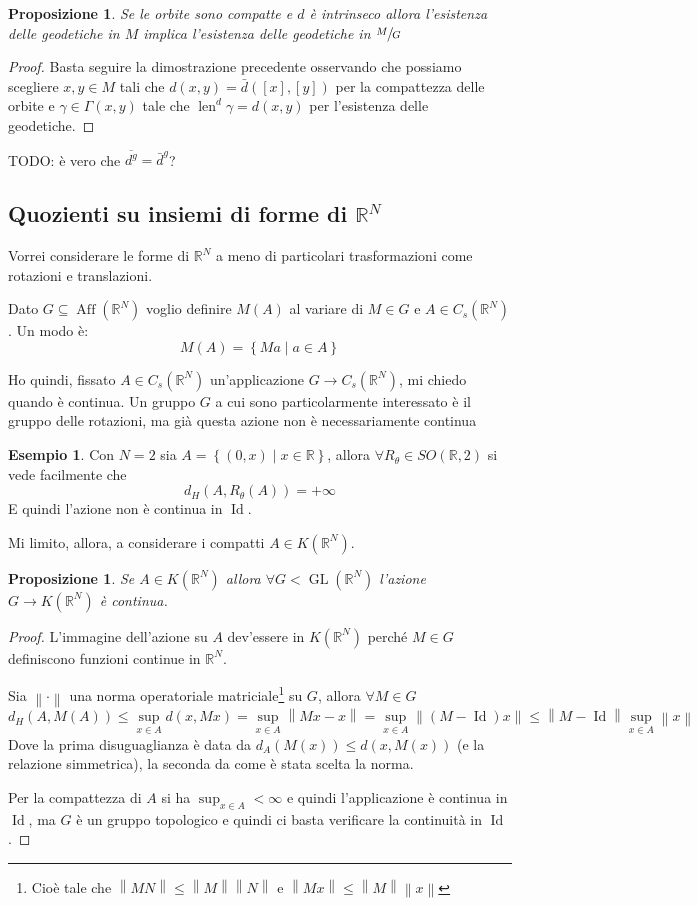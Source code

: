 \documentclass[a4paper,10pt]{article}
\newcounter{counter1}
\theoremstyle{plain}
\newtheorem{mypro}[counter1]{Proposizione}
\theoremstyle{definition}
\newtheorem{myes}[counter1]{Esempio}
\theoremstyle{remark}
\newcommand{\obar}[1]{\overline{#1}}
\newcommand{\set}[1]{\left\{#1\right\}}
\newcommand{\pa}[1]{\left(#1\right)}
\newcommand{\bra}[1]{\left[#1\right]}
\newcommand{\norm}[1]{\left\|#1\right\|}
\DeclareMathOperator{\id}{Id}
\DeclareMathOperator{\len}{len}
\DeclareMathOperator{\gl}{GL}
\DeclareMathOperator{\aff}{Aff}
\begin{document}
\begin{mypro}
  Se le orbite sono compatte e $d$ è intrinseco allora l'esistenza
  delle geodetiche in $M$ implica l'esistenza delle geodetiche in
  $\sfrac{M}{G}$
\end{mypro}
\begin{proof}
  Basta seguire la dimostrazione precedente osservando che possiamo
  scegliere $x,y \in M$ tali che $d(x,y) = \bar d (\bra{x}, \bra{y})$
  per la compattezza delle orbite e $\gamma \in \Gamma\pa{x,y}$ tale che
  $\len ^d \gamma = d(x,y)$ per l'esistenza delle geodetiche.
\end{proof}

TODO: è vero che $\obar{d^g} = \bar d ^g$?

\subsection{Quozienti su insiemi di forme di $\mathbb{R}^N$}

Vorrei considerare le forme di $\mathbb{R}^N$ a meno di particolari
trasformazioni come rotazioni e translazioni.

Dato $G \subseteq \aff(\mathbb{R}^N)$ voglio definire $M(A)$ al
variare di $M \in G$ e $A \in C_s(\mathbb{R}^N)$. Un modo è:
\[ M(A) = \set{ Ma \mid a \in A } \]

Ho quindi, fissato $A \in C_s(\mathbb{R}^N)$ un'applicazione $G \to
C_s(\mathbb{R}^N)$, mi chiedo quando è continua. Un gruppo $G$ a cui
sono particolarmente interessato è il gruppo delle rotazioni, ma già
questa azione non è necessariamente continua
\begin{myes}
  Con $N = 2$ sia $A = \set{(0,x) \mid x \in \mathbb{R}}$, allora
  $\forall R_\theta \in SO(\mathbb{R},2)$ si vede facilmente che
  \[ d_H(A, R_\theta (A)) = + \infty \] 
  E quindi l'azione non è continua in $\id$.
\end{myes}

Mi limito, allora, a considerare i compatti $A \in K(\mathbb{R}^N)$.

\begin{mypro}
  Se $A \in K(\mathbb{R}^N)$ allora $\forall G < \gl (\mathbb{R}^N)$
  l'azione $G \to K(\mathbb{R}^N)$ è continua.
\end{mypro}
\begin{proof}
  L'immagine dell'azione su $A$ dev'essere in $K(\mathbb{R}^N)$ perché
  $M\in G$ definiscono funzioni continue in $\mathbb{R}^N$.

  Sia $\norm{\cdot}$ una norma operatoriale matriciale\footnote{Cioè
    tale che $\norm{MN} \le \norm{M}\norm{N}$ e $\norm{Mx} \le
    \norm{M}\norm{x}$} su $G$, allora $\forall M \in G$
  \[ d_H(A, M(A)) \le \sup _{x \in A} d(x,Mx) = \sup _{x \in A}
  \norm{Mx -x} = \sup _{x \in A} \norm{ \pa{ M - \id} x } \le \norm{ M
    - \id } \sup _{x \in A} \norm{x} \]
  Dove la prima disuguaglianza è data da $d_A (M(x)) \le d (x,M(x))$
  (e la relazione simmetrica), la seconda da come è stata scelta la
  norma.

  Per la compattezza di $A$ si ha $\sup _{x \in A} < \infty$ e quindi
  l'applicazione è continua in $\id$, ma $G$ è un gruppo topologico e
  quindi ci basta verificare la continuità in $\id$.
\end{proof}
\end{document}
